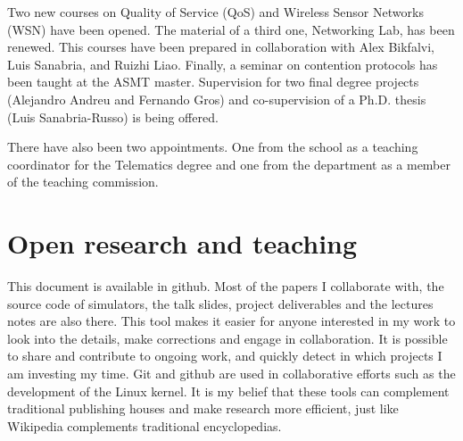 \documentclass[a4paper,twocolumns]{article}%
\begin{document}
Two new courses on Quality of Service (QoS) and Wireless Sensor Networks (WSN) have been opened.
The material of a third one, Networking Lab, has been renewed.
This courses have been prepared in collaboration with Alex Bikfalvi, Luis Sanabria, and Ruizhi Liao.
Finally, a seminar on contention protocols has been taught at the ASMT master.
Supervision for two final degree projects (Alejandro Andreu and Fernando Gros)  and co-supervision of a Ph.D. thesis (Luis Sanabria-Russo) is being offered.

There have also been two appointments.
One from the school as a teaching coordinator for the Telematics degree and one from the department as a member of the teaching commission.



\section{Open research and teaching}

This document is available in github.
Most of the papers I collaborate with, the source code of simulators, the talk slides, project deliverables and the lectures notes are also there.
This tool makes it easier for anyone interested in my work to look into the details, make corrections and engage in collaboration.
It is possible to share and contribute to ongoing work, and quickly detect in which projects I am investing my time.
Git and github are used in collaborative efforts such as the development of the Linux kernel.
It is my belief that these tools can complement traditional publishing houses and make research more efficient, just like Wikipedia complements traditional encyclopedias. 




\end{document}
